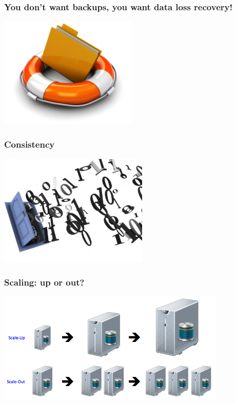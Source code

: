 \documentclass{beamer}
\begin{document}
\begin{frame}
  \frametitle{You don't want backups, you want data loss recovery!}

  \begin{center}
    \includegraphics[height=2.1in]{Data-Recovery-Service-Icon.jpg}
  \end{center}
\end{frame}

\begin{frame}
  \frametitle{Consistency}


  \begin{center}
    \includegraphics[height=2.1in]{bits.jpeg}
  \end{center}
\end{frame}

\begin{frame}
  \frametitle{Scaling: up or out?}

  \begin{center}
    \includegraphics[height=2.1in]{KB_Scale_Out-Up.png}
  \end{center}
\end{frame}
\end{document}
